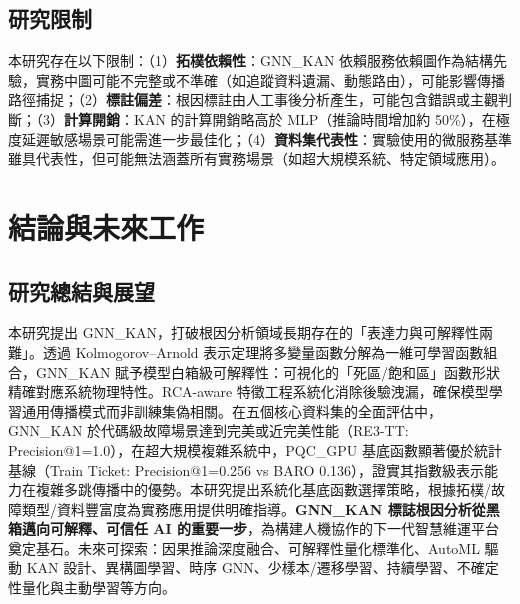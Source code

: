 \documentclass[10pt,a4paper,twocolumn]{article}
\begin{document}
\subsection{研究限制}

本研究存在以下限制：（1）\textbf{拓樸依賴性}：GNN\_KAN 依賴服務依賴圖作為結構先驗，實務中圖可能不完整或不準確（如追蹤資料遺漏、動態路由），可能影響傳播路徑捕捉；（2）\textbf{標註偏差}：根因標註由人工事後分析產生，可能包含錯誤或主觀判斷；（3）\textbf{計算開銷}：KAN 的計算開銷略高於 MLP（推論時間增加約 50\%），在極度延遲敏感場景可能需進一步最佳化；（4）\textbf{資料集代表性}：實驗使用的微服務基準雖具代表性，但可能無法涵蓋所有實務場景（如超大規模系統、特定領域應用）。

\section{結論與未來工作}

\subsection{研究總結與展望}

本研究提出 GNN\_KAN，打破根因分析領域長期存在的「表達力與可解釋性兩難」。透過 Kolmogorov–Arnold 表示定理將多變量函數分解為一維可學習函數組合，GNN\_KAN 賦予模型白箱級可解釋性：可視化的「死區/飽和區」函數形狀精確對應系統物理特性。RCA-aware 特徵工程系統化消除後驗洩漏，確保模型學習通用傳播模式而非訓練集偽相關。在五個核心資料集的全面評估中，GNN\_KAN 於代碼級故障場景達到完美或近完美性能（RE3-TT: Precision@1=1.0），在超大規模複雜系統中，PQC\_GPU 基底函數顯著優於統計基線（Train Ticket: Precision@1=0.256 vs BARO 0.136），證實其指數級表示能力在複雜多跳傳播中的優勢。本研究提出系統化基底函數選擇策略，根據拓樸/故障類型/資料豐富度為實務應用提供明確指導。\textbf{GNN\_KAN 標誌根因分析從黑箱邁向可解釋、可信任 AI 的重要一步}，為構建人機協作的下一代智慧維運平台奠定基石。未來可探索：因果推論深度融合、可解釋性量化標準化、AutoML 驅動 KAN 設計、異構圖學習、時序 GNN、少樣本/遷移學習、持續學習、不確定性量化與主動學習等方向。
\end{document}
